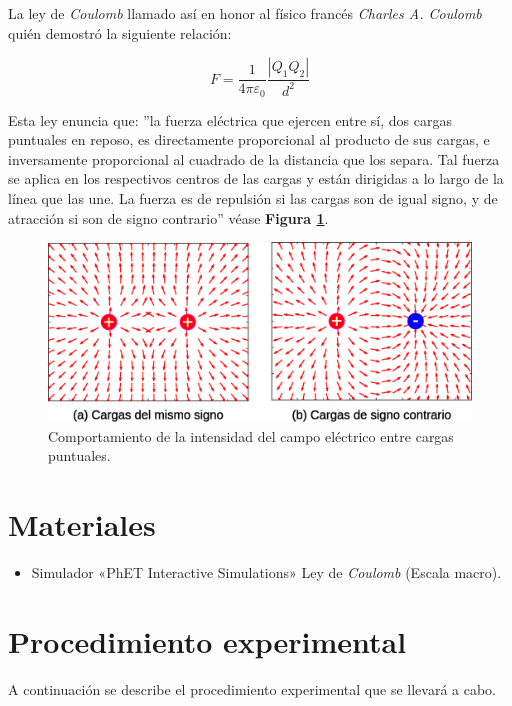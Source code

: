 \documentclass[letter,11pt]{article}
\begin{document}
La ley de \emph{Coulomb} llamado así en honor al físico francés \emph{Charles A.
Coulomb} quién demostró la siguiente relación:

\begin{equation}
    F = \frac{1}{4 \pi \varepsilon_0} \frac{| Q_1 Q_2 |}{d^2}
\label{coulomb}
\end{equation}

Esta ley enuncia que: ''la fuerza eléctrica que ejercen entre sí, dos cargas
puntuales en reposo, es directamente proporcional al producto de sus cargas, e
inversamente proporcional al cuadrado de la distancia que los separa. Tal fuerza
se aplica en los respectivos centros de las cargas y están dirigidas a lo largo
de la línea que las une. La fuerza es de repulsión si las cargas son de igual
signo, y de atracción si son de signo contrario'' véase
\textbf{Figura \ref{figura1}}.

\begin{figure}[!h]
\centering
\includegraphics[scale=0.45]{resources/figura1.eps}
\caption{Comportamiento de la intensidad del campo eléctrico entre cargas
puntuales.}
\label{figura1}
\end{figure}

\section{Materiales}
\begin{itemize}
\item Simulador «PhET Interactive Simulations» Ley de \emph{Coulomb} (Escala
macro).
\end{itemize}

\section{Procedimiento experimental}
A continuación se describe el procedimiento experimental que se llevará a
cabo.
\end{document}
